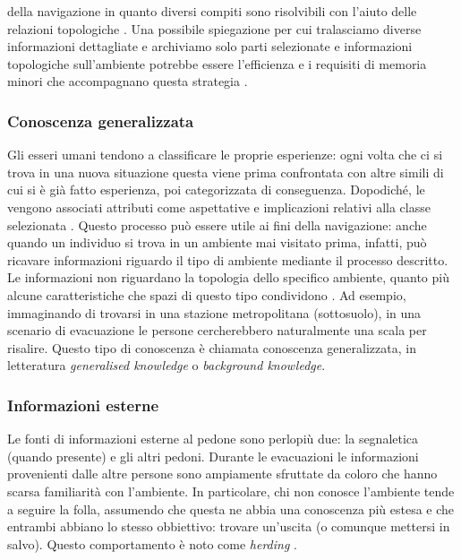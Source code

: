 \documentclass[12pt,a4paper,openright,oneside]{book}
\begin{document}
della navigazione in quanto diversi compiti sono risolvibili con l'aiuto delle relazioni topologiche \cite{Ellard2009}. Una  possibile spiegazione per cui tralasciamo diverse informazioni dettagliate e archiviamo solo parti selezionate e informazioni topologiche sull'ambiente potrebbe essere l'efficienza e i requisiti di memoria minori che accompagnano questa strategia \cite{Ellard2009}.


\subsubsection{Conoscenza generalizzata} 
Gli esseri umani tendono a classificare le proprie esperienze: ogni volta che ci si trova in una nuova situazione questa viene prima confrontata con altre simili di cui si è già fatto esperienza, poi categorizzata di conseguenza. Dopodiché, le vengono associati attributi come aspettative e implicazioni relativi alla classe selezionata \cite{Anderson2005, StPierre2014}. Questo processo può essere utile ai fini della navigazione: anche quando un individuo si trova in un ambiente mai visitato prima, infatti, può ricavare informazioni riguardo il tipo di ambiente mediante il processo descritto. Le informazioni non riguardano la topologia dello specifico ambiente, quanto più alcune caratteristiche che spazi di questo tipo condividono \cite{kalff2009, Wiener2009}. Ad esempio, immaginando di trovarsi in una stazione metropolitana (sottosuolo), in una scenario di evacuazione le persone cercherebbero naturalmente una scala per risalire. Questo tipo di conoscenza è chiamata conoscenza generalizzata, in letteratura \emph{generalised knowledge} o \emph{background knowledge}.

\subsubsection{Informazioni esterne} 
Le fonti di informazioni esterne al pedone sono perlopiù due: la segnaletica (quando presente) e gli altri pedoni. Durante le evacuazioni le informazioni provenienti dalle altre persone sono ampiamente sfruttate da coloro che hanno scarsa familiarità con l’ambiente. In particolare, chi non conosce l’ambiente tende a seguire la folla, assumendo che questa ne abbia una conoscenza più estesa e che entrambi abbiano lo stesso obbiettivo: trovare un’uscita (o comunque mettersi in salvo). Questo comportamento è noto come \emph{herding} \cite{Helbing2002}.
\end{document}
